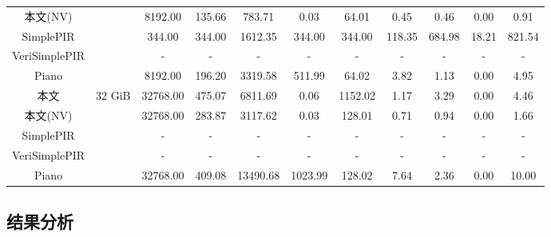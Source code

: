 \begin{table}[]
{\begin{tabular}{@{}cc|ccc|cccccc@{}}
        本文(NV)     &                           & 8192.00                      & 135.66                     & 783.71   & 0.03                          & \multicolumn{1}{c|}{64.01}   & 0.45   & 0.46   & 0.00        & 0.91   \\
        SimplePIR     &                           & 344.00                       & 344.00                     & 1612.35  & 344.00                        & \multicolumn{1}{c|}{344.00}  & 118.35 & 684.98 & 18.21       & 821.54 \\
        VeriSimplePIR &                           & -                            & -                          & -        & -                             & \multicolumn{1}{c|}{-}       & -      & -      & -           & -      \\
        Piano         &                           & 8192.00                      & 196.20                     & 3319.58  & 511.99                        & \multicolumn{1}{c|}{64.02}   & 3.82   & 1.13   & 0.00        & 4.95   \\ \midrule
        本文         & \multirow{5}{*}{32 GiB}  & 32768.00                     & 475.07                     & 6811.69  & 0.06                          & \multicolumn{1}{c|}{1152.02} & 1.17   & 3.29   & 0.00        & 4.46   \\
        本文(NV)     &                           & 32768.00                     & 283.87                     & 3117.62  & 0.03                          & \multicolumn{1}{c|}{128.01}  & 0.71   & 0.94   & 0.00        & 1.66   \\
        SimplePIR     &                           & -                            & -                          & -        & -                             & \multicolumn{1}{c|}{-}       & -      & -      & -           & -      \\
        VeriSimplePIR &                           & -                            & -                          & -        & -                             & \multicolumn{1}{c|}{-}       & -      & -      & -           & -      \\
        Piano         &                           & 32768.00                     & 409.08                     & 13490.68 & 1023.99                       & \multicolumn{1}{c|}{128.02}  & 7.64   & 2.36   & 0.00        & 10.00  \\ \bottomrule
    \end{tabular}%
    }
\end{table}
\subsection{结果分析}

